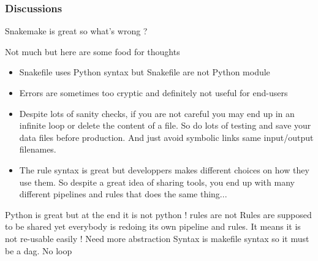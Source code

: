 \documentclass{beamer}
\begin{document}
 
\begin{frame}
\frametitle{Discussions}

\begin{block}{}
Snakemake is great so what's wrong ? 
\end{block}

\begin{block}{Not much but here are some food for thoughts}
\begin{itemize}
 \item Snakefile uses Python syntax but Snakefile are not Python module
 \item Errors are sometimes too cryptic and definitely not useful for end-users
 \item Despite lots of sanity checks, if you are not careful you may end up 
       in an infinite loop or delete the content of a file. So do lots of testing
       and save your data files before production. And just avoid symbolic links
       same input/output filenames.
 \item The rule syntax is great but developpers makes different choices on 
  how they use them. So despite a great idea of sharing tools, you end up 
  with many different pipelines and rules that does the same thing...
\end{itemize}

\end{block}



Python is great but at the end it is not python ! rules are not 
Rules are supposed to be shared yet everybody is redoing its own pipeline and rules. It means it is not re-usable easily ! Need more abstraction
Syntax is makefile syntax so it must be a dag. No loop
\end{frame}

\end{document}

